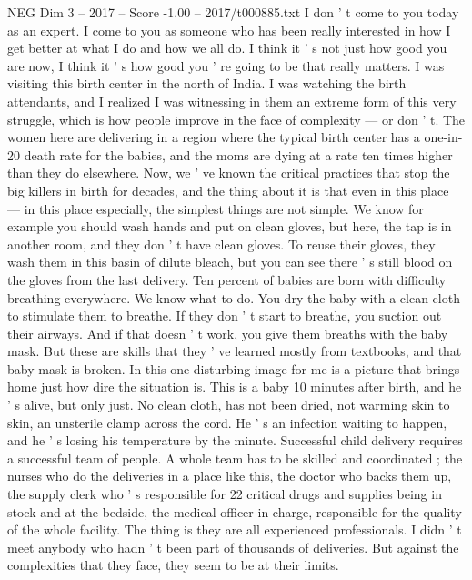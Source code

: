\begin{textsample}{NEG Dim 3 – 2017 – Score -1.00 – 2017/t000885.txt}  \label{ex:f3_neg_071}
I don ' t come to you today as an expert.
I come to you as someone who has been really interested in how I get better at what I do and how we all do.
I think it ' s not just how good you are now, I think it ' s how good you ' re going to be that really matters.
I was visiting this birth center in the north of India.
I was watching the birth attendants, and I realized I was witnessing in them an extreme form of this very struggle, which is how people improve in the face of complexity — or don ' t.
The women here are delivering in a region where the typical birth center has a one-in-20 death rate for the babies, and the moms are dying at a rate ten times higher than they do elsewhere.
Now, we ' ve known the critical practices that stop the big killers in birth for decades, and the thing about it is that even in this place — in this place especially, the simplest things are not simple.
We know for example you should wash hands and put on clean gloves, but here, the tap is in another room, and they don ' t have clean gloves.
To reuse their gloves, they wash them in this basin of dilute bleach, but you can see there ' s still blood on the gloves from the last delivery.
Ten percent of babies are born with difficulty breathing everywhere.
We know what to do.
You dry the baby with a clean cloth to stimulate them to breathe.
If they don ' t start to breathe, you suction out their airways.
And if that doesn ' t work, you give them breaths with the baby mask.
But these are skills that they ' ve learned mostly from textbooks, and that baby mask is broken.
In this one disturbing image for me is a picture that brings home just how dire the situation is.
This is a baby 10 minutes after birth, and he ' s alive, but only just.
No clean cloth, has not been dried, not warming skin to skin, an unsterile clamp across the cord.
He ' s an infection waiting to happen, and he ' s losing his temperature by the minute.
Successful child delivery requires a successful team of people.
A whole team has to be skilled and coordinated ; the nurses who do the deliveries in a place like this, the doctor who backs them up, the supply clerk who ' s responsible for 22 critical drugs and supplies being in stock and at the bedside, the medical officer in charge, responsible for the quality of the whole facility.
The thing is they are all experienced professionals.
I didn ' t meet anybody who hadn ' t been part of thousands of deliveries.
But against the complexities that they face, they seem to be at their limits.

\end{textsample}
